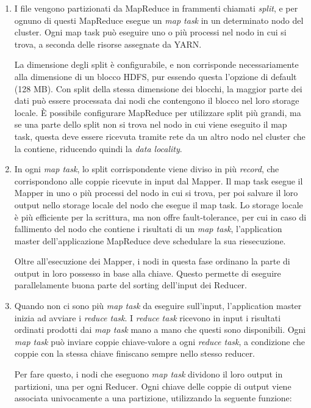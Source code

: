 \documentclass[italian,a4paper, twoside, 12pt]{report}
\begin{document}
\begin{enumerate}
\item
  I file vengono partizionati da MapReduce in frammenti chiamati
  \emph{split}, e per ognuno di questi MapReduce esegue un \emph{map
  task} in un determinato nodo del cluster. Ogni map task può eseguire
  uno o più processi nel nodo in cui si trova, a seconda delle risorse
  assegnate da YARN.

  La dimensione degli split è configurabile, e non corrisponde
  necessariamente alla dimensione di un blocco HDFS, pur essendo questa
  l'opzione di default (128 MB). Con split della stessa dimensione dei
  blocchi, la maggior parte dei dati può essere processata dai nodi che
  contengono il blocco nel loro storage locale. È possibile configurare
  MapReduce per utilizzare split più grandi, ma se una parte dello split
  non si trova nel nodo in cui viene eseguito il map task, questa deve
  essere ricevuta tramite rete da un altro nodo nel cluster che la
  contiene, riducendo quindi la \emph{data locality}.
\item
  In ogni \emph{map task}, lo split corrispondente viene diviso in più
  \emph{record}, che corrispondono alle coppie ricevute in input dal
  Mapper. Il map task esegue il Mapper in uno o più processi del nodo in
  cui si trova, per poi salvare il loro output nello storage locale del
  nodo che esegue il map task. Lo storage locale è più efficiente per la
  scrittura, ma non offre fault-tolerance, per cui in caso di fallimento
  del nodo che contiene i risultati di un \emph{map task}, l'application
  master dell'applicazione MapReduce deve schedulare la sua
  riesecuzione.

  Oltre all'esecuzione dei Mapper, i nodi in questa fase ordinano la
  parte di output in loro possesso in base alla chiave. Questo permette
  di eseguire parallelamente buona parte del sorting dell'input dei
  Reducer.
\item
  Quando non ci sono più \emph{map task} da eseguire sull'input,
  l'application master inizia ad avviare i \emph{reduce task}. I
  \emph{reduce task} ricevono in input i risultati ordinati prodotti dai
  \emph{map task} mano a mano che questi sono disponibili. Ogni
  \emph{map task} può inviare coppie chiave-valore a ogni \emph{reduce
  task}, a condizione che coppie con la stessa chiave finiscano sempre
  nello stesso reducer.

  Per fare questo, i nodi che eseguono \emph{map task} dividono il loro
  output in partizioni, una per ogni Reducer. Ogni chiave delle coppie
  di output viene associata univocamente a una partizione, utilizzando
  la seguente funzione:


\end{enumerate}
\end{document}
